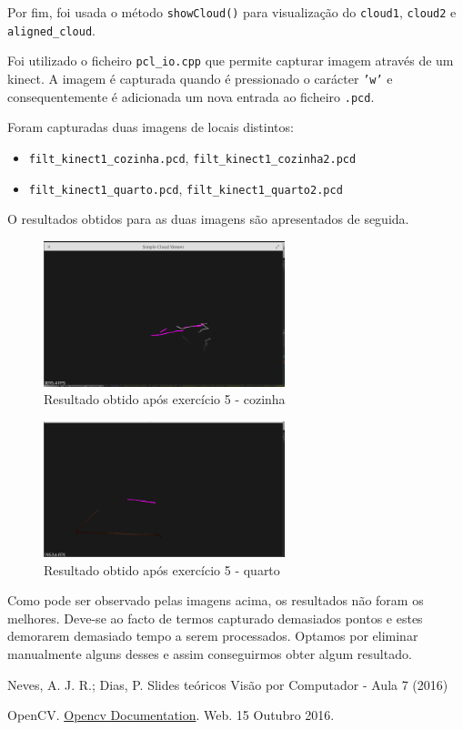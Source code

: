 \documentclass[portuguese, times, mirror]{revdetua}
\begin{document}
Por fim, foi usada o método \texttt{showCloud()} para visualização do \texttt{cloud1}, \texttt{cloud2} e \texttt{aligned\_cloud}. 

Foi utilizado o ficheiro \texttt{pcl\_io.cpp} que permite capturar imagem através de um kinect. A imagem é capturada quando é pressionado o carácter \texttt{'w'} e consequentemente é adicionada um nova entrada ao ficheiro \texttt{.pcd}. 

Foram capturadas duas imagens de locais distintos:
\begin{itemize}
    \item \texttt{filt\_kinect1\_cozinha.pcd},  \texttt{filt\_kinect1\_cozinha2.pcd}
    \item \texttt{filt\_kinect1\_quarto.pcd},  \texttt{filt\_kinect1\_quarto2.pcd}
\end{itemize}

O resultados obtidos para as duas imagens são apresentados de seguida. 

\begin{figure}[ht!]
\centering
\includegraphics[width=70mm]{img/cozinha.png}
\caption{Resultado obtido após exercício 5 - cozinha}
\end{figure}


\begin{figure}[ht!]
\centering
\includegraphics[width=70mm]{img/quarto.png}
\caption{Resultado obtido após exercício 5 - quarto}
\end{figure}

Como pode ser observado pelas imagens acima, os resultados não foram os melhores. Deve-se ao facto de termos capturado demasiados pontos e estes demorarem demasiado tempo a serem processados. Optamos por eliminar manualmente alguns desses e assim conseguirmos obter algum resultado.



\begin{thebibliography}{1} %



Neves, A. J. R.; Dias, P. Slides teóricos Visão por Computador - Aula 7 (2016)


OpenCV. \href{hhttp://docs.opencv.org/}{Opencv Documentation}. Web. 15 Outubro 2016. 




\end{thebibliography}
\end{document}
